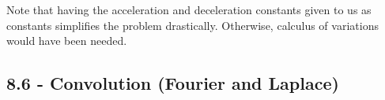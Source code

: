 \documentclass[a4paper]{article}
\begin{document}
Note that having the acceleration and deceleration constants given to us as constants simplifies the problem drastically. Otherwise, calculus of variations would have been needed.

\newpage
\subsection{\textsf{8.6 - Convolution (Fourier and Laplace)}}
\end{document}
